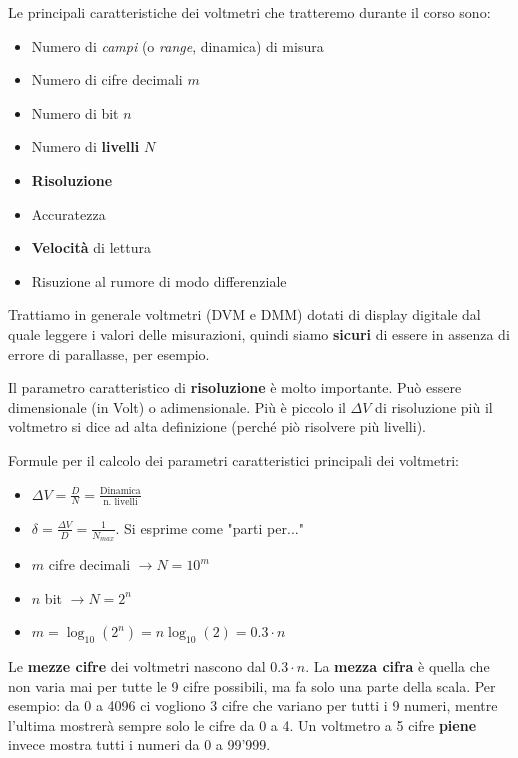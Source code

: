 \documentclass[a4paper,11pt]{report}
\begin{document}
Le principali caratteristiche dei voltmetri che tratteremo durante il corso sono:
\begin{itemize}
  \item Numero di \textit{campi} (o \textit{range}, dinamica) di misura
  \item Numero di cifre decimali $ m $
  \item Numero di bit $ n $
  \item Numero di \textbf{livelli} $ N $
  \item \textbf{Risoluzione}
  \item Accuratezza
  \item \textbf{Velocità} di lettura
  \item Risuzione al rumore di modo differenziale
\end{itemize}
Trattiamo in generale voltmetri (DVM e DMM) dotati di display digitale dal quale leggere i valori delle misurazioni, quindi siamo \textbf{sicuri} di essere in assenza di errore di parallasse, per esempio.

Il parametro caratteristico di \textbf{risoluzione} è molto importante. Può essere dimensionale (in Volt) o adimensionale. Più è piccolo il $\Delta V$ di risoluzione più il voltmetro si dice ad alta definizione (perché piò risolvere più livelli).

Formule per il calcolo dei parametri caratteristici principali dei voltmetri:
\begin{itemize}
  \item $ \Delta V = \frac{D}{N} = \frac{\text{Dinamica}}{\text{n. livelli}} $
  \item $ \delta = \frac{\Delta V}{D} = \frac{1}{N_{max}}$. Si esprime come "parti per..."
  \item $ m $ cifre decimali $ \rightarrow N = 10^m$
  \item $ n $ bit $ \rightarrow N = 2^n $
  \item $ m = \log_{10}(2^n) = n\log_{10}(2) = 0.3\cdot n $
\end{itemize} 

Le \textbf{mezze cifre} dei voltmetri nascono dal $ 0.3 \cdot n $. La \textbf{mezza cifra} è quella che non varia mai per tutte le 9 cifre possibili, ma fa solo una parte della scala. Per esempio: da 0 a 4096 ci vogliono 3 cifre che variano per tutti i 9 numeri, mentre l'ultima mostrerà sempre solo le cifre da 0 a 4. Un voltmetro a 5 cifre \textbf{piene} invece mostra tutti i numeri da 0 a 99'999.
\end{document}
